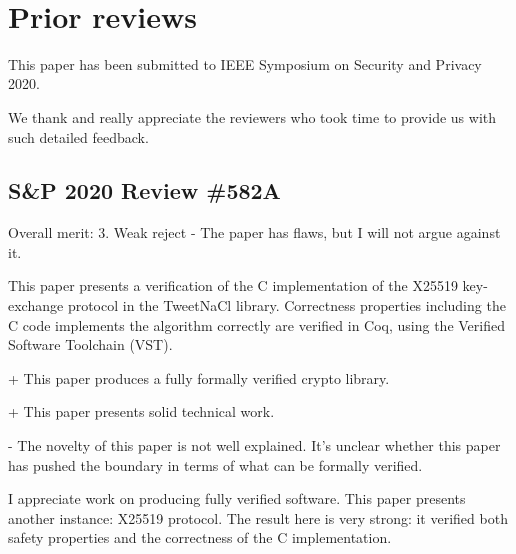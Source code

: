 \newpage
~\\
\newpage

\section{Prior reviews}
\label{appendix:past-reviews}

This paper has been submitted to IEEE Symposium on Security and Privacy 2020.

We thank and really appreciate the reviewers who took time to provide us with
such detailed feedback.

\subsection{S\&P 2020 Review \#582A}

Overall merit: 3. Weak reject - The paper has flaws, but I will not argue against it.


\begin{center}
\end{center}

This paper presents a verification of the C implementation of the X25519
key-exchange protocol in the TweetNaCl library.  Correctness properties
including the C code implements the algorithm correctly are verified in Coq,
using the Verified Software Toolchain (VST).


\begin{center}
\end{center}

+ This paper produces a fully formally verified crypto library.

+ This paper presents solid technical work.


\begin{center}
\end{center}

- The novelty of this paper is not well explained. It's unclear whether this
paper has pushed the boundary in terms of what can be formally verified.


\begin{center}
\end{center}

I appreciate work on producing fully verified software. This paper presents
another instance: X25519 protocol. The result here is very strong: it verified
both safety properties and the correctness of the C implementation.

